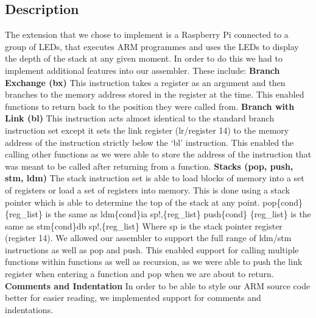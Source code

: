 \documentclass[a4paper]{article}
\begin{document}
\subsection{Description}
The extension that we chose to implement is a Raspberry Pi connected to a group of LEDs, that executes ARM programmes and uses the LEDs to display the depth of the stack at any given moment. In order to do this we had to implement additional features into our 
assembler. These include:
\newline
\textbf{Branch Exchange (bx)} \newline
This instruction takes a register as an argument and then branches to the memory address stored in the register at the time. This enabled functions to return back to the position they were called from. \newline
\textbf{Branch with Link (bl)} \newline
This instruction acts almost identical to the standard branch instruction set except it sets the link register (lr/register 14) to the memory address of the instruction strictly below the ‘bl’ instruction. This enabled the calling other functions as we were able to store the address of the instruction that was meant to be called after returning from a function. \newline
\textbf{Stacks (pop, push, stm, ldm)} \newline
The stack instruction set is able to load blocks of memory into a set of registers or load a set of registers into memory. This is done using a stack pointer which is able to determine the top of the stack at any point.
pop\{cond\} \{reg\_list\} is the same as ldm\{cond\}ia sp!,\{reg\_list\}
push\{cond\} \{reg\_list\} is the same as  stm\{cond\}db sp!,\{reg\_list\}
Where sp is the stack pointer register (register 14). We allowed our assembler to support the full range of ldm/stm instructions as well as pop and push. 
	This enabled support for calling multiple functions within functions as well as   
recursion, as we were able to push the link register when entering a function and pop 
when we are about to return.\newline
\textbf{Comments and Indentation}\newline
In order to be able to style our ARM source code better for easier reading, we implemented support for comments and indentations. \newline
\end{document}
